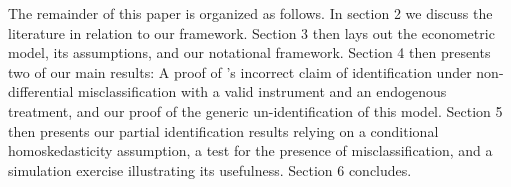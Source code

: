 The remainder of this paper is organized as follows. In section 2 we discuss the literature in relation to our framework. Section 3 then lays out the econometric model, its assumptions, and our notational framework. Section 4 then presents two of our main results: A proof of \citeauthor{Mahajan}'s incorrect claim of identification under non-differential misclassification with a valid instrument and an endogenous treatment, and our proof of the generic un-identification of this model. Section 5 then presents our partial identification results relying on a conditional homoskedasticity assumption, a test for the presence of misclassification, and a simulation exercise illustrating its usefulness. Section 6 concludes.


 


